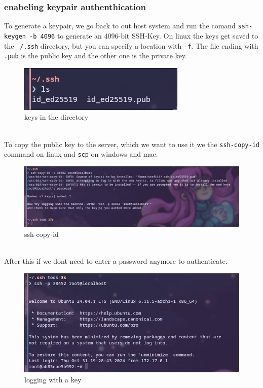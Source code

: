 \documentclass[a4paper]{article}
\begin{document}
\subsubsection{enabeling keypair authenthication}
To generate a keypair, we go back to out host system and run the comand \texttt{ssh-keygen -b 4096} to generate an 4096-bit SSH-Key. \cite{ssh-keygen}
On linux the keys get saved to the \texttt{~/.ssh} directory, but you can specify a location with \texttt{-f}. The file ending with \texttt{.pub} is the public key and the other one is the private key.
\begin{figure}[h]
	\centering
	\includegraphics[scale=0.5]{images/keys-in-the-dir.png}
	\caption{keys in the directory}
\end{figure} \\
To copy the public key to the server, which we want to use it we the \texttt{ssh-copy-id} command on linux and \texttt{scp} on windows and mac. \cite{ssh-copy-id}
\begin{figure}[h]
	\centering
	\includegraphics[scale=0.3]{images/ssh-copy-id.png}
	\caption{ssh-copy-id}
\end{figure} \\
After this if we dont need to enter a password anymore to authenticate.
\begin{figure}[h]
	\centering
	\includegraphics[scale=0.35]{images/login-with-key.png}
	\caption{logging with a key}
\end{figure} \\
\newpage
\end{document}
